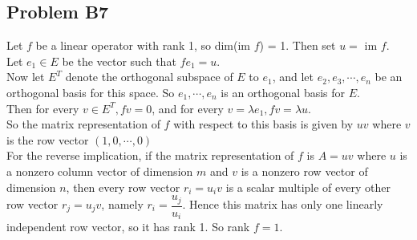 \documentclass{article}
\begin{document}
\subsection{Problem B7}
Let $f$ be a linear operator with rank 1, so dim(im $f$) = 1. Then set $u = $ im $f$. 
\\Let $e_1 \in E$ be the vector such that $fe_1 = u$. 
\\Now let $E^T$ denote the orthogonal subspace of $E$ to $e_1$, and let $e_2,e_3,\cdots,e_n$ be an orthogonal basis for this space. So $e_1,\cdots,e_n$ is an orthogonal basis for $E$.
\\Then for every $v \in E^T,fv=0$, and for every $v=\lambda e_1,fv=\lambda u$. 
\\So the matrix representation of $f$ with respect to this basis is given by $uv$ where $v$ is the row vector $(1,0,\cdots ,0)$
\\For the reverse implication, if the matrix representation of $f$ is $A=uv$ where $u$ is a nonzero column vector of dimension $m$ and $v$ is a nonzero row vector of dimension $n$, then every row vector $r_i = u_i v$ is a scalar multiple of every other row vector $r_j = u_j v$, namely $r_i = \dfrac{u_j}{u_i}$. Hence this matrix has only one linearly independent row vector, so it has rank 1. So rank $f = 1$. 
\end{document}
